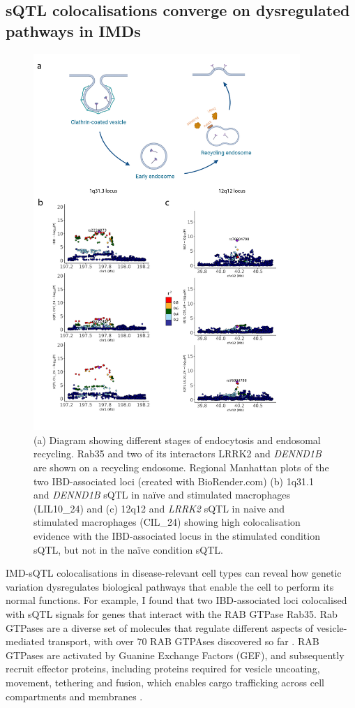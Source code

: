 \subsection{sQTL colocalisations converge on dysregulated pathways in IMDs}
\begin{figure}
  \centering
  \includegraphics[width=0.9\textwidth]{dennd1b}
  \caption{(a) Diagram showing different stages of endocytosis and endosomal recycling. Rab35 and two of its interactors LRRK2 and \textit{DENND1B} are shown on a recycling endosome. Regional Manhattan plots of the two IBD-associated loci (created with BioRender.com) (b) 1q31.1 and \textit{DENND1B} sQTL in naïve and stimulated macrophages (LIL10\_24) and (c) 12q12 and \textit{LRRK2} sQTL in naive and stimulated macrophages (CIL\_24) showing high colocalisation evidence with the IBD-associated locus in the stimulated condition sQTL, but not in the naïve condition sQTL.}
  \label{fig:dennd1b}   
\end{figure}
IMD-sQTL colocalisations in disease-relevant cell types can reveal how genetic variation dysregulates biological pathways that enable the cell to perform its normal functions.
For example, I found that two IBD-associated loci colocalised with sQTL signals for genes that interact with the RAB GTPase Rab35. Rab GTPases are a diverse set of molecules that regulate different aspects of vesicle-mediated transport, with over 70 RAB GTPAses discovered so far \cite{Sigismund2021-cu}. RAB GTPases are activated by Guanine Exchange Factors (GEF), and subsequently recruit effector proteins, including proteins required for vesicle uncoating, movement, tethering and fusion, which enables cargo trafficking across cell compartments and membranes \cite{Yoneyama2005-ba}.\\

